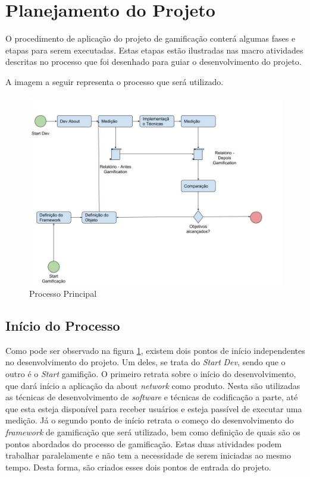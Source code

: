 \section{Planejamento do Projeto}
\label{sub:planejamento_do_projeto}
O procedimento de aplicação do projeto de gamificação conterá algumas fases
e etapas para serem executadas. Estas etapas estão ilustradas nas macro atividades 
descritas no processo que foi desenhado para guiar o desenvolvimento
do projeto.

A imagem a seguir representa o processo que será utilizado.

\begin{figure}[h]
    \centering
    \includegraphics[width=450px, scale=1]{figuras/mainprocess}
    \caption{Processo Principal}
    \label{fig:mainprocess}
\end{figure}

\subsection{Início do Processo}
\label{sub:initialprocess}
Como pode ser observado na figura \ref{fig:mainprocess}, existem dois pontos
de início independentes no desenvolvimento do projeto. Um deles, se trata do
\textit{Start} \textit{Dev}, sendo que o outro é o \textit{Start} gamifição. O primeiro retrata sobre
o início do desenvolvimento, que dará início a aplicação da about \textit{network}
como produto. Nesta são utilizadas as técnicas de desenvolvimento de \textit{software}
e técnicas de codificação a parte, até que esta esteja disponível para receber
usuários e esteja passível de executar uma medição. Já o segundo ponto de início
retrata o começo do desenvolvimento do \textit{framework} de gamificação que será utilizado,
bem como definição de quais são os pontos abordados do processo de gamificação.
Estas duas atividades podem trabalhar paralelamente e não tem a necessidade de
serem iniciadas ao mesmo tempo. Desta forma, são criados esses dois pontos de
entrada do projeto.

